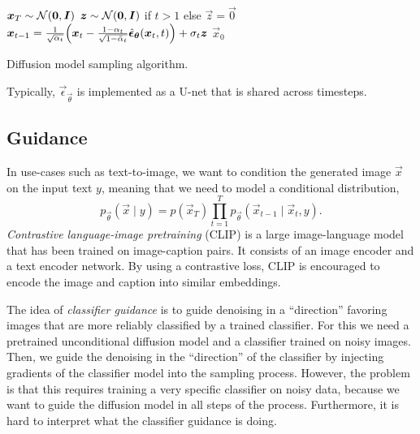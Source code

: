 \begin{algorithm}
    \begin{algorithmic}[1]
        \State $\bm{x}_T \sim \mathcal{N}(\bm{0}, \bm{I})$
        \State $\bm{z} \sim \mathcal{N}(\bm{0}, \bm{I})$ if $t > 1$ else $\vec{z} = \vec{0}$
        \State $\vec{x}_{t-1} = \frac{1}{\sqrt{\alpha_t}} \lft( \vec{x}_t - \frac{1 - \alpha_t}{\sqrt{1 - \bar{\alpha}_t}} \hat{\vec{\epsilon}}_{\vec{\theta}}(\vec{x}_t, t) \rgt) + \sigma_t \vec{z}$
        \EndFor
        \State \Return $\vec{x}_0$
    \end{algorithmic}
    \caption{Diffusion model sampling algorithm.}
\end{algorithm}

Typically, $\vec{\epsilon}_{\vec{\theta}}$ is implemented as a U-net that is shared across timesteps.

\subsection{Guidance}

In use-cases such as text-to-image, we want to condition the generated image $\vec{x}$ on the input
text $y$, meaning that we need to model a conditional distribution, \[
    p_{\vec{\theta}}(\vec{x}\mid y) = p(\vec{x}_T) \prod_{t=1}^{T}  p_{\vec{\theta}}(\vec{x}_{t-1} \mid \vec{x}_t, y).
\]
\textit{Contrastive language-image pretraining} (CLIP) \citep{radford2021learning} is a large
image-language model that has been trained on image-caption pairs. It consists of an image encoder
and a text encoder network. By using a contrastive loss, CLIP is encouraged to encode the image and
caption into similar embeddings.

The idea of \textit{classifier guidance} is to guide denoising in a ``direction'' favoring images
that are more reliably classified by a trained classifier. For this we need a pretrained
unconditional diffusion model and a classifier trained on noisy images. Then, we guide the denoising
in the ``direction'' of the classifier by injecting gradients of the classifier model into the
sampling process. However, the problem is that this requires training a very specific classifier on
noisy data, because we want to guide the diffusion model in all steps of the process. Furthermore, it
is hard to interpret what the classifier guidance is doing.

